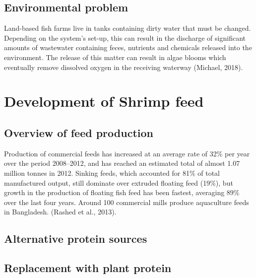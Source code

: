 \documentclass[
]{book}
\begin{document}
\hypertarget{environmental-problem}{%
\subsection{Environmental problem}\label{environmental-problem}}

Land-based fish farms live in tanks containing dirty water that must be
changed. Depending on the system's set-up, this can result in the
discharge of significant amounts of wastewater containing feces,
nutrients and chemicals released into the environment. The release of
this matter can result in algae blooms which eventually remove dissolved
oxygen in the receiving waterway (Michael, 2018).

\hypertarget{development-of-shrimp-feed}{%
\section{Development of Shrimp feed}\label{development-of-shrimp-feed}}

\hypertarget{overview-of-feed-production}{%
\subsection{Overview of feed production}\label{overview-of-feed-production}}

Production of commercial feeds has increased at an average rate of 32\%
per year over the period 2008--2012, and has reached an estimated total
of almost 1.07 million tonnes in 2012. Sinking feeds, which accounted
for 81\% of total manufactured output, still dominate over extruded
floating feed (19\%), but growth in the production of floating fish feed
has been fastest, averaging 89\% over the last four years. Around 100
commercial mills produce aquaculture feeds in Bangladesh. (Rashed et
al., 2013).

\hypertarget{alternative-protein-sources}{%
\subsection{Alternative protein sources}\label{alternative-protein-sources}}

\hypertarget{replacement-with-plant-protein}{%
\subsection*{Replacement with plant protein}\label{replacement-with-plant-protein}}
\end{document}
